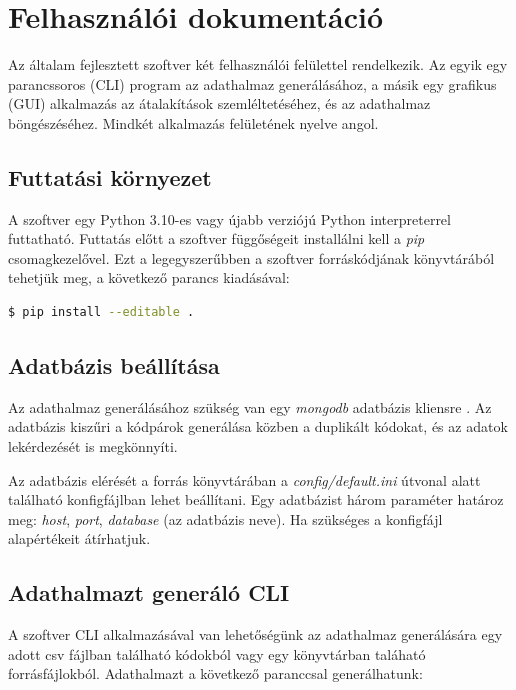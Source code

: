 \chapter{Felhasználói dokumentáció}
\label{ch:user}

Az általam fejlesztett szoftver két felhasználói felülettel rendelkezik.
Az egyik egy parancssoros (CLI) program az adathalmaz generálásához,
a másik egy grafikus (GUI) alkalmazás az átalakítások szemléltetéséhez,
és az adathalmaz böngészéséhez.
Mindkét alkalmazás felületének nyelve angol.

\section{Futtatási környezet}

A szoftver egy Python 3.10-es vagy újabb verziójú Python interpreterrel futtatható.
Futtatás előtt a szoftver függőségeit installálni kell a \emph{pip} csomagkezelővel.
Ezt a legegyszerűbben a szoftver forráskódjának könyvtárából tehetjük meg,
a következő parancs kiadásával:

\begin{lstlisting}[language=bash, numbers=none]
	$ pip install --editable .
\end{lstlisting}

\section{Adatbázis beállítása}

Az adathalmaz generálásához szükség van egy \emph{mongodb} adatbázis kliensre \cite{installMongodb}.
Az adatbázis kiszűri a kódpárok generálása közben a duplikált kódokat,
és az adatok lekérdezését is megkönnyíti.

Az adatbázis elérését a forrás könyvtárában a \emph{config/default.ini} útvonal alatt található
konfigfájlban lehet beállítani.
Egy adatbázist három paraméter határoz meg: \emph{host}, \emph{port}, \emph{database} (az adatbázis neve).
Ha szükséges a konfigfájl alapértékeit átírhatjuk.

\section{Adathalmazt generáló CLI}

A szoftver CLI alkalmazásával van lehetőségünk az adathalmaz generálására egy
adott csv fájlban található kódokból vagy egy könyvtárban taláható forrásfájlokból.
Adathalmazt a következő paranccsal generálhatunk:

